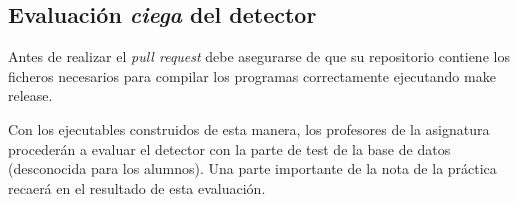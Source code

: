\subsection*{Evaluación {\itshape ciega} del detector }

Antes de realizar el {\itshape pull request} debe asegurarse de que su repositorio contiene los ficheros necesarios para compilar los programas correctamente ejecutando {\ttfamily make release}.

Con los ejecutables construidos de esta manera, los profesores de la asignatura procederán a evaluar el detector con la parte de test de la base de datos (desconocida para los alumnos). Una parte importante de la nota de la práctica recaerá en el resultado de esta evaluación. 